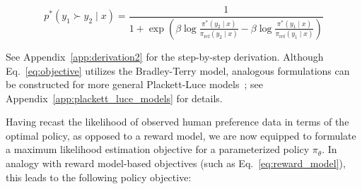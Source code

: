 \begin{equation}\label{eq:objective}
    p^*(y_1\succ y_2 \mid x)=\frac{1}{1 + \exp\left(\beta \log \frac{\pi^*(y_2\mid x)}{\pi_\text{ref}(y_2\mid x)} - \beta \log \frac{\pi^*(y_1\mid x)}{\pi_\text{ref}(y_1\mid x)}\right)}
\end{equation}

See Appendix~\ref{app:derivation2} for the step-by-step derivation. Although Eq.~\ref{eq:objective} utilizes the Bradley-Terry model, analogous formulations can be constructed for more general Plackett-Luce models~\citep{plackett1975analysis, luce2012individual}; see Appendix~\ref{app:plackett_luce_models} for details.

Having recast the likelihood of observed human preference data in terms of the optimal policy, as opposed to a reward model, we are now equipped to formulate a maximum likelihood estimation objective for a parameterized policy $\pi_\theta$. In analogy with reward model-based objectives (such as Eq.~\ref{eq:reward_model}), this leads to the following policy objective:

